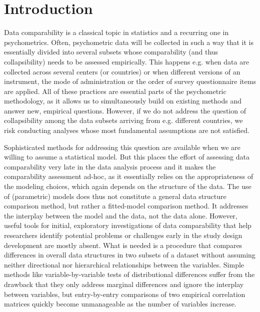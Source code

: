 \documentclass[a4paper,14pt]{article}
\begin{document}
\raggedright
\setlength{\parindent}{0.5cm}
\textwidth 5.25in
\textheight 8.75in

\date{}



\newcommand{\lorem}{{\bf LOREM}}
\newcommand{\ipsum}{{\bf IPSUM}}




\section*{Introduction}\label{sec:introduction}


Data comparability is a classical topic in statistics and a recurring one in psychometrics. Often, psychometric data will be collected in such a way that it is essentially divided into several subsets whose comparability (and thus collapsibility) needs to be assessed empirically. This happens e.g. when data are collected across several centers (or countries) or when different versions of an instrument, the mode of administration or the order of survey questionnaire items are applied. All of these practices are essential parts of the psychometric methodology, as it allows us to simultaneously build on existing methods and answer new, empirical questions. However, if we do not address the question of collapsibility among the data subsets arriving from e.g. different countries, we risk conducting analyses whose most fundamental assumptions are not satisfied.

Sophisticated methods for addressing this question are available when we are willing to assume a statistical model. But this places the effort of assessing data comparability very late in the data analysis process and it makes the comparability assessment ad-hoc, as it essentially relies on the appropriateness of the modeling choices, which again depends on the structure of the data. The use of (parametric) models does thus not constitute a %
general data structure comparison method, but rather a fitted-model comparison method. It addresses the interplay between the model and the data, not the data alone. However, useful tools for initial, exploratory investigations of data comparability that help researchers identify potential problems or challenges early in the study design development are mostly absent. What is needed is a procedure that compares differences in overall data structures in two subsets of a dataset without assuming neither directional nor hierarchical relationships between the variables. Simple methods like variable-by-variable tests of distributional differences suffer from the drawback that they only address marginal differences and ignore the interplay between variables, but entry-by-entry comparisons of two empirical correlation matrices quickly become unmanageable as the number of variables increase.
\end{document}
